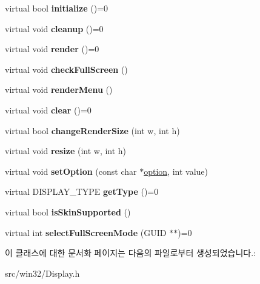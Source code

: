 \begin{DoxyCompactItemize}
\item 
\mbox{\label{class_i_display_aa849b5d829138d08cf9efdbb00364a96}} 
virtual bool {\bfseries initialize} ()=0
\item 
\mbox{\label{class_i_display_a039e8c6b3f8fbee485fb895ef70e72c0}} 
virtual void {\bfseries cleanup} ()=0
\item 
\mbox{\label{class_i_display_af61c440b97da313a502e86346a729b03}} 
virtual void {\bfseries render} ()=0
\item 
\mbox{\label{class_i_display_afcb9df4a4949d13491f9a07a2ce24eb0}} 
virtual void {\bfseries check\+Full\+Screen} ()
\item 
\mbox{\label{class_i_display_ad6fc199a615635440ca01485c1283d41}} 
virtual void {\bfseries render\+Menu} ()
\item 
\mbox{\label{class_i_display_affb8a8b5651d138058cdbd088ff3968d}} 
virtual void {\bfseries clear} ()=0
\item 
\mbox{\label{class_i_display_ab6e4355da026afb85710ae3e12329176}} 
virtual bool {\bfseries change\+Render\+Size} (int w, int h)
\item 
\mbox{\label{class_i_display_ad0b4ba99f59edd7a6857e3b3941b3ba2}} 
virtual void {\bfseries resize} (int w, int h)
\item 
\mbox{\label{class_i_display_a1766244708c252bb8781892c76c20ba9}} 
virtual void {\bfseries set\+Option} (const char $\ast$\mbox{\hyperlink{structoption}{option}}, int value)
\item 
\mbox{\label{class_i_display_a2c7fd4c6721dd8a6992b78f0c588f6f9}} 
virtual D\+I\+S\+P\+L\+A\+Y\+\_\+\+T\+Y\+PE {\bfseries get\+Type} ()=0
\item 
\mbox{\label{class_i_display_ad717007b624f0a8e7c830ab803cd8a92}} 
virtual bool {\bfseries is\+Skin\+Supported} ()
\item 
\mbox{\label{class_i_display_a2f7a55f63c5e4b24245aa88228afab68}} 
virtual int {\bfseries select\+Full\+Screen\+Mode} (G\+U\+ID $\ast$$\ast$)=0
\end{DoxyCompactItemize}


이 클래스에 대한 문서화 페이지는 다음의 파일로부터 생성되었습니다.\+:\begin{DoxyCompactItemize}
\item 
src/win32/Display.\+h\end{DoxyCompactItemize}
